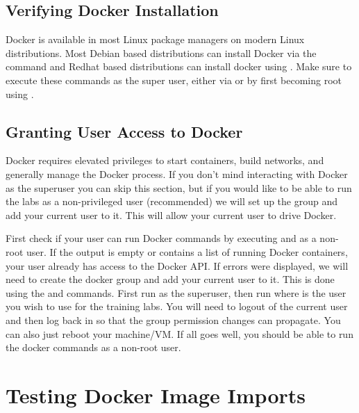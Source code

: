 
\subsection{Verifying Docker Installation}

Docker is available in most Linux package managers on modern Linux
distributions. Most Debian based distributions can install Docker via
the command  and Redhat based distributions can
install docker using . Make sure to execute these
commands as the super user, either via  or by first becoming
root using .

\subsection{Granting User Access to Docker}

Docker requires elevated privileges to start containers, build
networks, and generally manage the Docker process. If you don't mind
interacting with Docker as the superuser you can skip this section, but
if you would like to be able to run the labs as a non-privileged user
(recommended) we will set up the  group and add your current
user to it. This will allow your current user to drive Docker.

First check if your user can run Docker commands by executing  and  as a non-root user. If the output is
empty or contains a list of running Docker containers, your user already
has access to the Docker API. If errors were displayed, we will need to
create the docker group and add your current user to it. This is done
using the  and  commands. First run  as the superuser, then run  where
 is the user you wish to use for
the training labs. You will need to logout of the current user and then
log back in so that the group permission changes can propagate. You can
also just reboot your machine/VM. If all goes well, you should be able
to run the docker commands as a non-root user.

\section{Testing Docker Image Imports}

